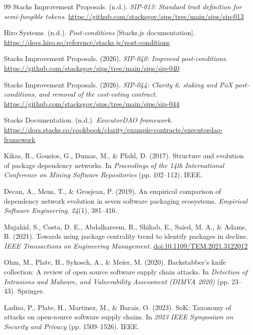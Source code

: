 \begin{thebibliography}{99}
 Stacks Improvement Proposals. (n.d.). \textit{SIP-013: Standard trait definition for semi-fungible tokens}. \url{https://github.com/stacksgov/sips/tree/main/sips/sip-013}

 Hiro Systems. (n.d.). \textit{Post-conditions} [Stacks.js documentation]. \url{https://docs.hiro.so/reference/stacks.js/post-conditions}

 Stacks Improvement Proposals. (2026). \textit{SIP-040: Improved post-conditions}. \url{https://github.com/stacksgov/sips/tree/main/sips/sip-040}

 Stacks Improvement Proposals. (2026). \textit{SIP-044: Clarity 6, staking and PoX post-conditions, and removal of the cost-voting contract}. \url{https://github.com/stacksgov/sips/tree/main/sips/sip-044}

 Stacks Documentation. (n.d.). \textit{ExecutorDAO framework}. \url{https://docs.stacks.co/cookbook/clarity/example-contracts/executordao-framework}

 Kikas, R., Gousios, G., Dumas, M., \& Pfahl, D. (2017). Structure and evolution of package dependency networks. In \textit{Proceedings of the 14th International Conference on Mining Software Repositories} (pp. 102--112). IEEE.

 Decan, A., Mens, T., \& Grosjean, P. (2019). An empirical comparison of dependency network evolution in seven software packaging ecosystems. \textit{Empirical Software Engineering}, \textit{24}(1), 381--416.

 Mujahid, S., Costa, D. E., Abdalkareem, R., Shihab, E., Saied, M. A., \& Adams, B. (2021). Towards using package centrality trend to identify packages in decline. \textit{IEEE Transactions on Engineering Management}. \href{https://doi.org/10.1109/TEM.2021.3122012}{doi:10.1109/TEM.2021.3122012}

 Ohm, M., Plate, H., Sykosch, A., \& Meier, M. (2020). Backstabber's knife collection: A review of open source software supply chain attacks. In \textit{Detection of Intrusions and Malware, and Vulnerability Assessment (DIMVA 2020)} (pp. 23--43). Springer.

 Ladisa, P., Plate, H., Martinez, M., \& Barais, O. (2023). SoK: Taxonomy of attacks on open-source software supply chains. In \textit{2023 IEEE Symposium on Security and Privacy} (pp. 1509--1526). IEEE.


\end{thebibliography}
